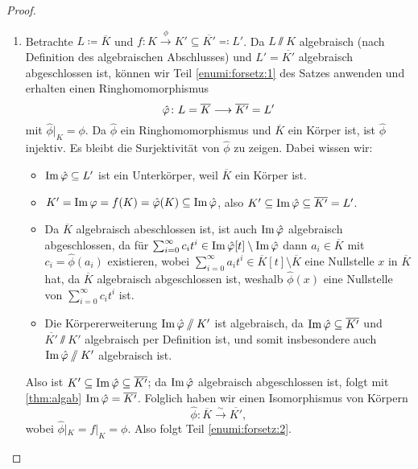 \documentclass[12pt,a4paper]{scrartcl}
\begin{document}
\begin{proof}
\begin{enumerate}
\begin{itemize}
\begin{proof}[Beweis der Behauptung]
\begin{itemize}
					Also ist $(M_{\max}, \ev_{a'}\circ \beta)\in Z$, da $\ev_{a'}\circ \beta\colon M_{\max}(a)\to L'$ offensichtlich ein Ringhomomorphismus mit $(\ev_{a'}\circ \beta)|_K = \ev_{a'}|_K = f$ nach Konstruktion ist. Das ist ein Widerspruch zur Maximalität von $(M_{\max}, g_{\max})$. Damit folgt die Behauptung und insgesamt Teil \ref{enumi:forsetz:1} des Satzes.
        \qedhere
				\end{itemize}
			\end{proof}
		\end{itemize}
		\item Betrachte $L \coloneqq \overline{K}$ und $f\colon K\xrightarrow{\phi} K'\subseteq \overline{K'} \eqqcolon L'$. Da $L\sslash K$ algebraisch (nach Definition des algebraischen Abschlusses) und $L' = \overline{K'}$ algebraisch abgeschlossen ist, können wir Teil \ref{enumi:forsetz:1} des Satzes anwenden und erhalten einen Ringhomomorphismus
		\[\hat{\varphi}\colon L = \overline{K}\longrightarrow \overline{K'} = L'\]
		mit $\hat{\phi}|_K = \phi$. Da $\hat\phi$ ein Ringhomomorphismus und $\overline{K}$ ein Körper ist, ist $\hat\phi$ injektiv. Es bleibt die Surjektivität von $\hat{\phi}$ zu zeigen. Dabei wissen wir:
		\begin{itemize}
			\item $\operatorname{Im}\hat{\varphi} \subseteq L'$ ist ein Unterkörper, weil $\overline{K}$ ein Körper ist.
			\item $K' = \operatorname{Im}\varphi = f(K) = \hat{\varphi}(K)\subseteq \operatorname{Im}\hat{\varphi}$, also $K'\subseteq \operatorname{Im}\hat{\varphi}\subseteq \overline{K'} = L'$.
			\item Da $\overline{K}$ algebraisch abeschlossen ist, ist auch $\operatorname{Im} \hat{\varphi}$ algebraisch abgeschlossen, da für $\sum_{i = 0}^{\infty}c_it^i\in \operatorname{Im} \hat{\varphi}[t]\setminus \operatorname{Im}\hat{\varphi}$ dann $a_i\in \overline{K}$ mit $c_i = \hat{\phi}(a_i)$ existieren, wobei $\sum_{i = 0}^{\infty} a_it^i\in \overline{K}[t]\setminus \overline{K}$ eine Nullstelle $x$ in $\overline{K}$ hat, da $\overline{K}$ algebraisch abgeschlossen ist, weshalb $\hat{\phi}(x)$ eine Nullstelle von $\sum_{i = 0}^{\infty}c_it^i$ ist.
			\item Die Körpererweiterung $\operatorname{Im}\hat{\varphi}\sslash K'$ ist algebraisch, da $\operatorname{Im}\hat{\varphi}\subseteq\overline{K'}$ und $\overline{K'}\sslash K'$ algebraisch per Definition ist, und somit insbesondere auch $\operatorname{Im}\hat{\varphi}\sslash K'$ algebraisch ist.
		\end{itemize} 
		Also ist $K'\subseteq  \operatorname{Im}\hat {\varphi}\subseteq \overline{K'}$; da $\operatorname{Im}\hat{\varphi}$ algebraisch abgeschlossen ist, folgt mit \cref{thm:algab} $\operatorname{Im}\hat{\varphi} = \overline{K'}$. Folglich haben wir einen Isomorphismus von Körpern
		\[\hat{\phi}\colon \overline{K}\xrightarrow{\sim} \overline{K'},\]
		wobei $\hat{\phi}|_K = f|_K = \phi$. Also folgt Teil \ref{enumi:forsetz:2}.
  \qedhere
	\end{enumerate}
\end{proof}
\end{document}
